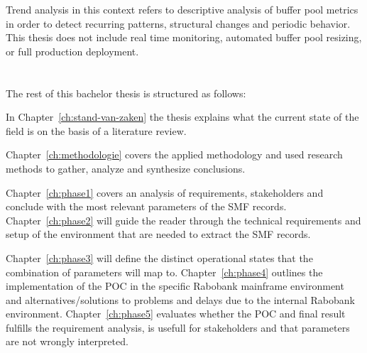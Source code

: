 Trend analysis in this context refers to descriptive analysis of buffer pool metrics in order to detect recurring patterns, structural changes and periodic behavior.
This thesis does not include real time monitoring, automated buffer pool resizing, or full production deployment. 

\section{}%
\label{sec:opzet-bachelorproef}


The rest of this bachelor thesis is structured as follows:

In Chapter~\ref{ch:stand-van-zaken} the thesis explains what the current state of the field is on the basis of a literature review.



Chapter~\ref{ch:methodologie} covers the applied methodology and used research methods to gather, analyze and synthesize conclusions. 

Chapter~\ref{ch:phase1} covers an analysis of requirements, stakeholders and conclude with the most relevant parameters of the SMF records.
Chapter~\ref{ch:phase2} will guide the reader through the technical requirements and setup of the environment that are needed to extract the SMF records.

Chapter~\ref{ch:phase3} will define the distinct operational states that the combination of parameters will map to.
Chapter~\ref{ch:phase4} outlines the implementation of the POC in the specific Rabobank mainframe environment and alternatives/solutions to problems and delays due to the internal Rabobank environment.
Chapter~\ref{ch:phase5} evaluates whether the POC and final result fulfills the requirement analysis, is usefull for stakeholders and that parameters are not wrongly interpreted.

